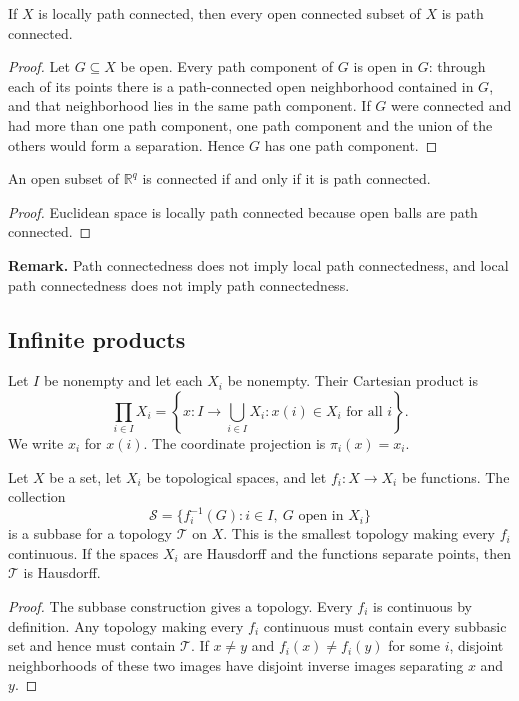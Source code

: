 \begin{thm}
If $X$ is locally path connected, then every open connected subset of $X$ is
path connected.
\end{thm}

\begin{proof}
Let $G\subseteq X$ be open. Every path component of $G$ is open in $G$:
through each of its points there is a path-connected open neighborhood
contained in $G$, and that neighborhood lies in the same path component. If
$G$ were connected and had more than one path component, one path component
and the union of the others would form a separation. Hence $G$ has one path
component.
\end{proof}

\begin{cor}
An open subset of $\mathbb{R}^q$ is connected if and only if it is path
connected.
\end{cor}

\begin{proof}
Euclidean space is locally path connected because open balls are path
connected.
\end{proof}

\textbf{Remark.} Path connectedness does not imply local path connectedness,
and local path connectedness does not imply path connectedness.

\subsection{Infinite products}

\begin{de}
Let $I$ be nonempty and let each $X_i$ be nonempty. Their Cartesian product is
\[
\prod_{i\in I}X_i
=\left\{x:I\to\bigcup_{i\in I}X_i:x(i)\in X_i\text{ for all }i\right\}.
\]
We write $x_i$ for $x(i)$. The coordinate projection is
$\pi_i(x)=x_i$.
\end{de}

\begin{thm}
Let $X$ be a set, let $X_i$ be topological spaces, and let
$f_i:X\to X_i$ be functions. The collection
\[
\mathcal{S}=\{f_i^{-1}(G):i\in I,\ G\text{ open in }X_i\}
\]
is a subbase for a topology $\mathcal{T}$ on $X$. This is the smallest
topology making every $f_i$ continuous. If the spaces $X_i$ are Hausdorff
and the functions separate points, then $\mathcal{T}$ is Hausdorff.
\end{thm}

\begin{proof}
The subbase construction gives a topology. Every $f_i$ is continuous by
definition. Any topology making every $f_i$ continuous must contain every
subbasic set and hence must contain $\mathcal{T}$. If $x\neq y$ and
$f_i(x)\neq f_i(y)$ for some $i$, disjoint neighborhoods of these two images
have disjoint inverse images separating $x$ and $y$.
\end{proof}

